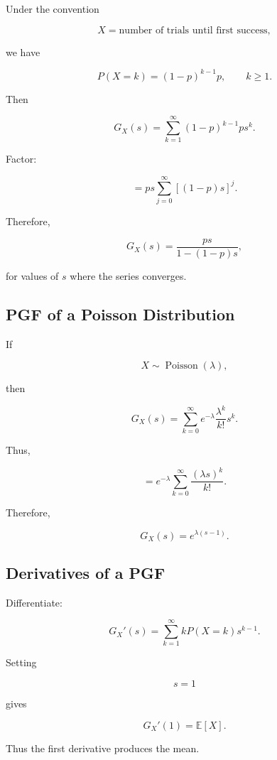 Under the convention

\[
X
=
\text{number of trials until first success},
\]

we have

\[
P(X=k)
=
(1-p)^{k-1}p,
\qquad
k\geq1.
\]

Then

\[
G_X(s)
=
\sum_{k=1}^{\infty}
(1-p)^{k-1}ps^k.
\]

Factor:

\[
=
ps
\sum_{j=0}^{\infty}
[(1-p)s]^j.
\]

Therefore,

\[
\boxed{
G_X(s)
=
\frac{
ps
}{
1-(1-p)s
},
}
\]

for values of \(s\) where the series converges.

\subsection{PGF of a Poisson Distribution}
\label{subsec:pgf-poisson}

If

\[
X\sim\operatorname{Poisson}(\lambda),
\]

then

\[
G_X(s)
=
\sum_{k=0}^{\infty}
e^{-\lambda}
\frac{\lambda^k}{k!}
s^k.
\]

Thus,

\[
=
e^{-\lambda}
\sum_{k=0}^{\infty}
\frac{(\lambda s)^k}{k!}.
\]

Therefore,

\[
\boxed{
G_X(s)
=
e^{\lambda(s-1)}.
}
\]

\subsection{Derivatives of a PGF}
\label{subsec:pgf-derivatives}

Differentiate:

\[
G_X'(s)
=
\sum_{k=1}^{\infty}
kP(X=k)s^{k-1}.
\]

Setting

\[
s=1
\]

gives

\[
\boxed{
G_X'(1)
=
\mathbb{E}[X].
}
\]

Thus the first derivative produces the mean.


